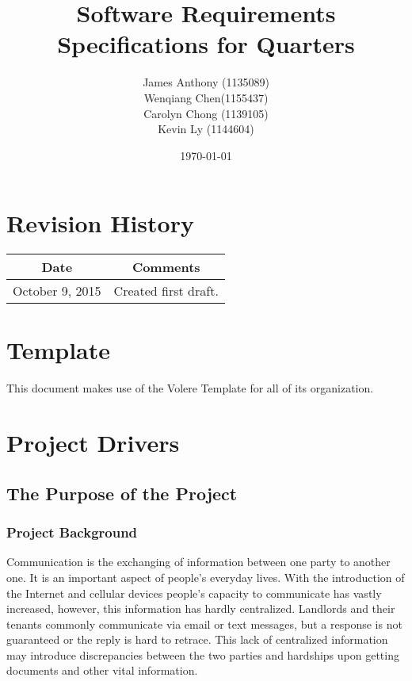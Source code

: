 \documentclass[12pt, titlepage]{article}
\begin{document}
\title{Software Requirements Specifications for Quarters} 
\author{James Anthony (1135089)\\ Wenqiang Chen(1155437)\\ Carolyn Chong 
(1139105)\\ Kevin Ly (1144604)}
\date{\today}
\maketitle

\tableofcontents 
\listoffigures
\listoftables

\section*{Revision History}
\begin{tabular}{|c|c|}
\hline
\textbf{Date}  & \textbf{Comments} \\ \hline
October 9, 2015 & Created first draft. \\ 
\hline
\end{tabular}

\section*{Template}
This document makes use of the Volere Template for all of its organization.

\pagebreak

\section{Project Drivers}
\subsection{The Purpose of the Project}
\subsubsection{Project Background}
Communication is the exchanging of information between one party to another 
one. It is an important aspect of people's everyday lives. With the introduction 
of the Internet and cellular devices people's capacity to communicate has vastly 
increased, however, this information has hardly centralized. Landlords and their 
tenants commonly communicate via email or text messages, but a response is not 
guaranteed or the reply is hard to retrace. This lack of centralized 
information may introduce discrepancies between the two parties and hardships 
upon getting documents and other vital information.\\
\end{document}
